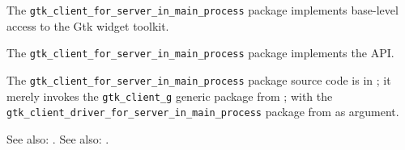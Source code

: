 
The {\tt gtk\_client\_for\_server\_in\_main\_process} package implements base-level access to the Gtk widget 
toolkit.

The {\tt gtk\_client\_for\_server\_in\_main\_process} package implements the  API.

The {\tt gtk\_client\_for\_server\_in\_main\_process} package source code is in ; 
it merely invokes the {\tt gtk\_client\_g} generic package from 
; with the {\tt gtk\_client\_driver\_for\_server\_in\_main\_process} package from 
 as argument. 

See also:  .
See also:  .


